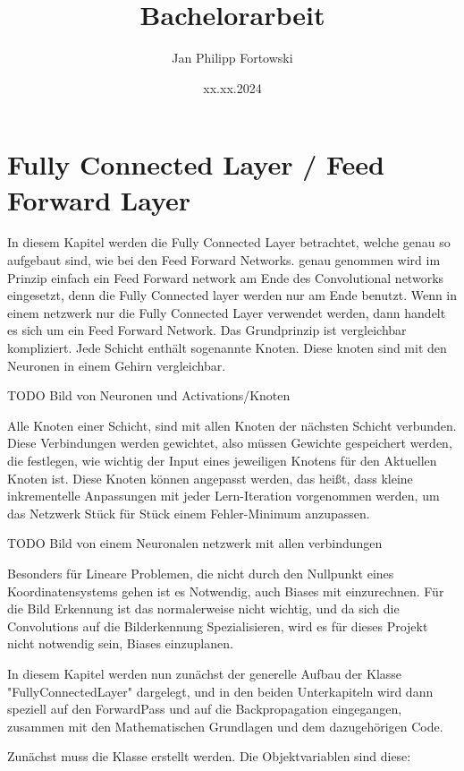 \documentclass[12pt]{article}
\title{\textbf{Bachelorarbeit}}
\author{Jan Philipp Fortowski}
\date{xx.xx.2024}
\begin{document}
\maketitle
\cleardoublepage
\tableofcontents
\cleardoublepage
\thispagestyle{empty}



\section{Fully Connected Layer / Feed Forward Layer}
In diesem Kapitel werden die Fully Connected Layer betrachtet, welche genau so aufgebaut sind, wie bei den Feed Forward Networks. genau genommen wird im Prinzip einfach ein Feed Forward network am Ende des Convolutional networks eingesetzt, denn die Fully Connected layer werden nur am Ende benutzt. Wenn in einem netzwerk nur die Fully Connected Layer verwendet werden, dann handelt es sich um ein Feed Forward Network. 
Das Grundprinzip ist vergleichbar kompliziert. Jede Schicht enthält sogenannte Knoten. Diese knoten sind mit den Neuronen in einem Gehirn vergleichbar.

TODO Bild von Neuronen und Activations/Knoten

Alle Knoten einer Schicht, sind mit allen Knoten der nächsten Schicht verbunden. Diese Verbindungen werden gewichtet, also müssen Gewichte gespeichert werden, die festlegen, wie wichtig der Input eines jeweiligen Knotens für den Aktuellen Knoten ist. Diese Knoten können angepasst werden, das heißt, dass kleine inkrementelle Anpassungen mit jeder Lern-Iteration vorgenommen werden, um das Netzwerk Stück für Stück einem Fehler-Minimum anzupassen. 

TODO Bild von einem Neuronalen netzwerk mit allen verbindungen

Besonders für Lineare Problemen, die nicht durch den Nullpunkt eines Koordinatensystems gehen ist es Notwendig, auch Biases mit einzurechnen. Für die Bild Erkennung ist das normalerweise nicht wichtig, und da sich die Convolutions auf die Bilderkennung Spezialisieren, wird es für dieses Projekt nicht notwendig sein, Biases einzuplanen.

In diesem Kapitel werden nun zunächst der generelle Aufbau der Klasse "FullyConnectedLayer" dargelegt, und in den beiden Unterkapiteln wird dann speziell auf den ForwardPass und auf die Backpropagation eingegangen, zusammen mit den Mathematischen Grundlagen und dem dazugehörigen Code.

Zunächst muss die Klasse erstellt werden. Die Objektvariablen sind diese:
    
\end{document}
